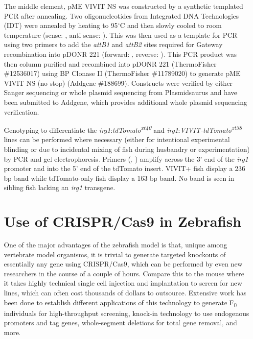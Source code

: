 The middle element, pME VIVIT NS was constructed by a synthetic templated PCR after annealing. Two oligonucleotides from Integrated DNA Technologies (IDT) were annealed by heating to 95$^{\circ}$C and then slowly cooled to room temperature (sense: , anti-sense: ). This was then used as a template for PCR using two primers to add the \textit{attB1} and \textit{attB2} sites required for Gateway recombination into pDONR 221 (forward: , reverse: ). This PCR product was then column purified and recombined into pDONR 221 (ThermoFisher \#12536017) using BP Clonase II (ThermoFisher \#11789020) to generate pME VIVIT NS (no stop) (Addgene \#188699). Constructs were verified by either Sanger sequencing or whole plasmid sequencing from Plasmidsaurus and have been submitted to Addgene, which provides additional whole plasmid sequencing verification.

Genotyping to differentiate the \textit{irg1}:\textit{tdTomato\textsuperscript{xt40}} and \textit{irg1}:\textit{VIVIT-tdTomato\textsuperscript{xt38}} lines can be performed where necessary (either for intentional experimental blinding or due to incidental mixing of fish during husbandry or experimentation) by PCR and gel electrophoresis. Primers (, ) amplify across the 3' end of the \textit{irg1} promoter and into the 5' end of the tdTomato insert. VIVIT+ fish display a 236 bp band while tdTomato-only fish display a 163 bp band. No band is seen in sibling fish lacking an \textit{irg1} transgene. 

\section{Use of CRISPR/Cas9 in Zebrafish}\label{crispr}

One of the major advantages of the zebrafish model is that, unique among vertebrate model organisms, it is trivial to generate targeted knockouts of essentially any gene using CRISPR/Cas9, which can be performed by even new researchers in the course of a couple of hours. Compare this to the mouse where it takes highly technical single cell injection and implantation to screen for new lines, which can often cost thousands of dollars to outsource. Extensive work has been done to establish different applications of this technology to generate F\textsubscript{0} individuals for high-throughput screening, knock-in technology to use endogenous promoters and tag genes, whole-segment deletions for total gene removal, and more. 

